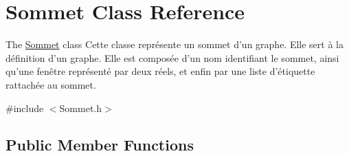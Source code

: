 \hypertarget{class_sommet}{\section{Sommet Class Reference}
\label{class_sommet}
}


The \hyperlink{class_sommet}{Sommet} class Cette classe représente un sommet d'un graphe. Elle sert à la définition d'un graphe. Elle est composée d'un nom identifiant le sommet, ainsi qu'une fenêtre représenté par deux réels, et enfin par une liste d'étiquette rattachée au sommet.  




{\ttfamily \#include $<$Sommet.\+h$>$}

\subsection*{Public Member Functions}
